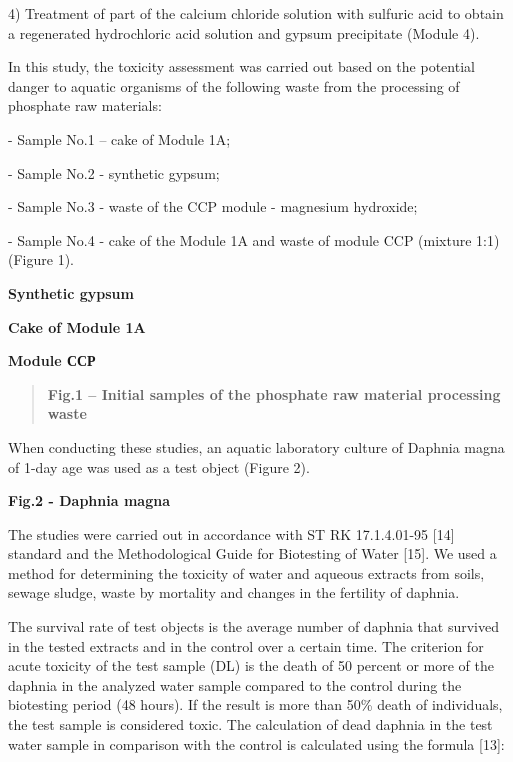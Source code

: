 \begin{multicols}{2}
4) Treatment of part of the calcium chloride solution with sulfuric acid
to obtain a regenerated hydrochloric acid solution and gypsum
precipitate (Module 4).

In this study, the toxicity assessment was carried out based on the
potential danger to aquatic organisms of the following waste from the
processing of phosphate raw materials:

- Sample No.1 -- cake of Module 1A;

- Sample No.2 - synthetic gypsum;

- Sample No.3 - waste of the CCP module - magnesium hydroxide;

- Sample No.4 - cake of the Module 1A and waste of module CCP (mixture
1:1) (Figure 1).
\end{multicols}


{\bfseries Synthetic gypsum}

{\bfseries Cake of Module 1A}

{\bfseries Module ССР}

\begin{quote}
{\bfseries Fig.1 -- Initial samples of the phosphate raw material
processing waste}
\end{quote}

When conducting these studies, an aquatic laboratory culture of Daphnia
magna of 1-day age was used as a test object (Figure 2).


{\bfseries Fig.2 - Daphnia magna}

The studies were carried out in accordance with ST RK 17.1.4.01-95
{[}14{]} standard and the Methodological Guide for Biotesting of Water
{[}15{]}. We used a method for determining the toxicity of water and
aqueous extracts from soils, sewage sludge, waste by mortality and
changes in the fertility of daphnia.

The survival rate of test objects is the average number of daphnia that
survived in the tested extracts and in the control over a certain time.
The criterion for acute toxicity of the test sample
(DL) is the death of 50 percent or more of the daphnia
in the analyzed water sample compared to the control during the
biotesting period (48 hours). If the result is more than 50\% death of
individuals, the test sample is considered toxic. The calculation of
dead daphnia in the test water sample in comparison with the control is
calculated using the formula {[}13{]}:

